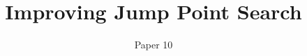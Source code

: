 \documentclass[letterpaper]{article}
\begin{document}
\title{Improving Jump Point Search}
\author{Paper 10}


\maketitle





%






%

%


\end{document}
